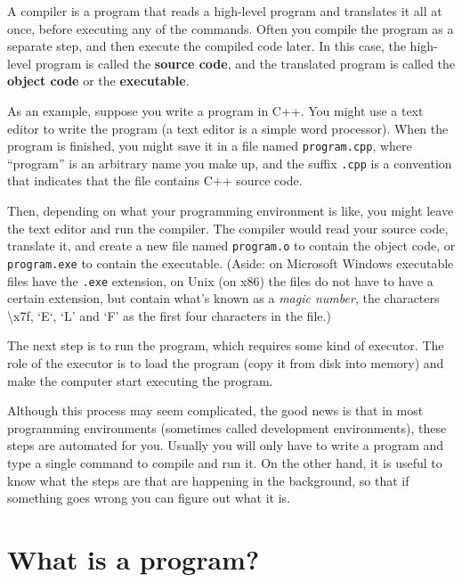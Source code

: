 \vspace{0.1in}
\centerline{}
\vspace{0.1in}

A compiler is a program that reads a high-level program and
translates it all at once, before executing any of the commands.
Often you compile the program as a separate step, and then
execute the compiled code later.  In this case, the high-level
program is called the {\bf source code}, and the translated
program is called the {\bf object code} or the {\bf executable}.

As an example, suppose you write a program in C++.  You might
use a text editor to write the program (a text editor is
a simple word processor).  When the program is finished, you
might save it in a file named {\tt program.cpp}, where ``program''
is an arbitrary name you make up, and the suffix {\tt .cpp} is
a convention that indicates that the file contains C++ source
code.

Then, depending on what your programming environment is like,
you might leave the text editor and run the compiler.  The
compiler would read your source code, translate it, and create
a new file named {\tt program.o} to contain the object code,
or {\tt program.exe} to contain the executable.  (Aside: on Microsoft Windows executable files have the {\tt .exe} extension, on Unix (on x86) the files do not have to have a certain extension, but contain what's known as a {\it magic number}, the characters \textbackslash{}x7f, `E`, `L' and `F' as the first four characters in the file.)  

\vspace{0.1in}
\centerline{}
\vspace{0.1in}

The next step is to run the program, which requires some kind
of executor.  The role of the executor is to load the program
(copy it from disk into memory) and make the computer start
executing the program.

Although this process may seem complicated, the good news is that in
most programming environments (sometimes called development
environments), these steps are automated for you.  Usually you will
only have to write a program and type a single command to compile and
run it.  On the other hand, it is useful to know what the steps are
that are happening in the background, so that if something goes wrong
you can figure out what it is.

\section{What is a program?}

